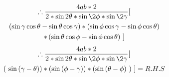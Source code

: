 \documentclass[journal,12pt,twocolumn]{IEEEtran}
\begin{document}
\vspace{0.3cm}
\begin{multline*}
        \therefore \frac{4ab*2}{2*\sin2\theta*\sin\2\phi*\sin\2\gamma}
        [\\  \left(\sin\gamma\cos\theta - \sin\theta\cos\gamma \right)*\left(\sin\phi\cos\gamma - \sin\phi\cos\theta \right)\\
        *\left(\sin\theta\cos\phi - \sin\phi\cos\theta \right)
        ~]
\end{multline*}
\vspace{0.3cm}
\begin{multline*}
        \therefore \frac{4ab*2}{2*\sin2\theta*\sin\2\phi*\sin\2\gamma}
        [\\  \left(~\sin\left(\gamma-\theta     \right) \right)*
        \left(\sin\left(\phi-\gamma     \right) \right)*
        \left(\sin\left(\theta-\phi \right)~ \right)~]=R.H.S
\end{multline*}
\end{document}
